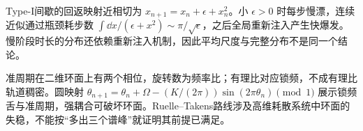 Type-I间歇的回返映射近相切为 $x_{n+1}=x_n+\epsilon+x_n^2$。小 $\epsilon>0$ 时每步慢漂，连续近似通过瓶颈耗步数 $\int\dd x/(\epsilon+x^2)\sim\pi/\sqrt\epsilon$，之后全局重新注入产生快爆发。慢阶段时长的分布还依赖重新注入机制，因此平均尺度与完整分布不是同一个结论。

准周期在二维环面上有两个相位，旋转数为频率比；有理比对应锁频，不成有理比轨道稠密。圆映射 $\theta_{n+1}=\theta_n+\Omega-(K/(2\pi))\sin(2\pi\theta_n)\pmod1$ 展示锁频舌与准周期，强耦合可破坏环面。Ruelle--Takens路线涉及高维耗散系统中环面的失稳，不能按“多出三个谱峰”就证明其前提已满足。
